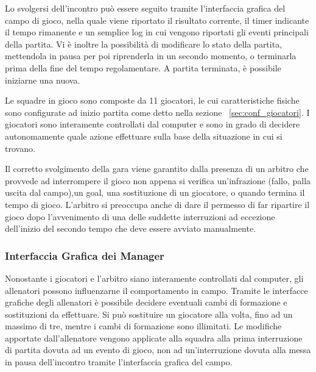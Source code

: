 Lo svolgersi dell'incontro pu\`{o} essere seguito tramite l'interfaccia grafica del campo di gioco, nella quale viene riportato il risultato corrente, il timer indicante il tempo rimanente e un semplice log in cui vengono riportati gli eventi principali della partita. Vi \`{e} inoltre la possibilit\`{a} di modificare lo stato della partita, mettendola in pausa per poi riprenderla in un secondo momento, o terminarla prima della fine del tempo regolamentare. A partita terminata, \`{e} possibile iniziarne una nuova.

Le squadre in gioco sono composte da 11 giocatori, le cui caratteristiche fisiche sono configurate ad inizio partita come detto nella sezione ~\ref{sec:conf_giocatori}. I giocatori sono interamente controllati dal computer e sono in grado di decidere autonomamente quale azione effettuare sulla base della situazione in cui si trovano.

Il corretto svolgimento della gara viene garantito dalla presenza di un arbitro che provvede ad interrompere il gioco non appena si verifica un'infrazione (fallo, palla uscita dal campo),un goal, una sostituzione di un giocatore, o quando termina il tempo di gioco. L'arbitro si preoccupa anche di dare il permesso di far ripartire il gioco dopo l'avvenimento di una delle suddette interruzioni ad eccezione dell'inizio del secondo tempo che deve essere avviato manualmente.\\

\subsubsection*{Interfaccia Grafica dei Manager}
%
\label{sec:gui_manager} 
Nonostante i giocatori e l'arbitro siano interamente controllati dal computer, gli allenatori possono influenzarne il comportamento in campo. Tramite le interfacce grafiche degli allenatori \`{e}  possibile decidere eventuali cambi di formazione e sostituzioni da effettuare. Si pu\`{o}  sostituire un giocatore alla volta, fino ad un massimo di tre, mentre i cambi di formazione sono illimitati. Le modifiche apportate dall'allenatore vengono applicate alla squadra alla prima interruzione di partita dovuta ad un evento di gioco, non ad un'interruzione dovuta alla messa in pausa dell'incontro tramite l'interfaccia grafica del campo.
